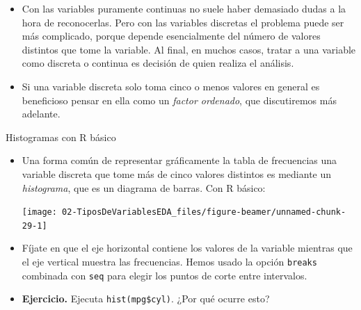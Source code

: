 \documentclass[
  9pt,
  ignorenonframetext,
]{beamer}
\newenvironment{Shaded}{\begin{snugshade}}{\end{snugshade}}
\newcommand{\DataTypeTok}[1]{\textcolor[rgb]{0.13,0.29,0.53}{#1}}
\newcommand{\DecValTok}[1]{\textcolor[rgb]{0.00,0.00,0.81}{#1}}
\newcommand{\KeywordTok}[1]{\textcolor[rgb]{0.13,0.29,0.53}{\textbf{#1}}}
\newcommand{\NormalTok}[1]{#1}
\newcommand{\OperatorTok}[1]{\textcolor[rgb]{0.81,0.36,0.00}{\textbf{#1}}}
\newcommand{\StringTok}[1]{\textcolor[rgb]{0.31,0.60,0.02}{#1}}
\begin{document}
\begin{frame}

\begin{itemize}
\item
  Con las variables puramente continuas no suele haber demasiado dudas a
  la hora de reconocerlas. Pero con las variables discretas el problema
  puede ser más complicado, porque depende esencialmente del número de
  valores distintos que tome la variable. Al final, en muchos casos,
  tratar a una variable como discreta o continua es decisión de quien
  realiza el análisis.
\item
  Si una variable discreta solo toma cinco o menos valores en general es
  beneficioso pensar en ella como un \emph{factor ordenado}, que
  discutiremos más adelante.
\end{itemize}

\end{frame}

\begin{frame}[fragile]{Histogramas con R básico}
\protect\hypertarget{histogramas-con-r-basico}{}

\begin{itemize}
\item
  Una forma común de representar gráficamente la tabla de frecuencias
  una variable discreta que tome más de cinco valores distintos es
  mediante un \emph{histograma}, que es un diagrama de barras. Con R
  básico:

\begin{Shaded}
\end{Shaded}

  \begin{center}\texttt{[image: 02-TiposDeVariablesEDA\_files/figure-beamer/unnamed-chunk-29-1]} \end{center}
\item
  Fíjate en que el eje horizontal contiene los valores de la variable
  mientras que el eje vertical muestra las frecuencias. Hemos usado la
  opción \texttt{breaks} combinada con \texttt{seq} para elegir los
  puntos de corte entre intervalos.
\item
  \textbf{Ejercicio.} Ejecuta \texttt{hist(mpg\$cyl)}. ¿Por qué ocurre
  esto?
\end{itemize}

\end{frame}
\end{document}
